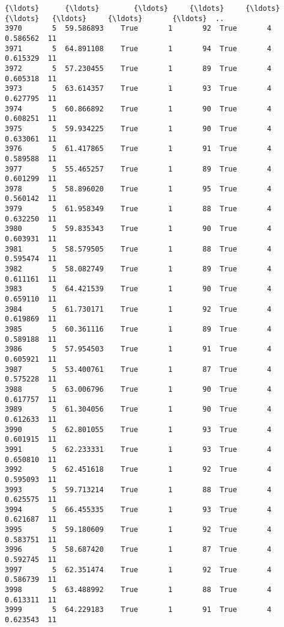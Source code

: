 \documentclass[11pt]{article}
\begin{document}
\begin{Verbatim}[commandchars=\\\{\}]
{\ldots}      {\ldots}        {\ldots}     {\ldots}     {\ldots}      {\ldots}   {\ldots}     {\ldots}       {\ldots}  ..   
3970       5  59.586893    True       1       92  True       4  0.586562  11   
3971       5  64.891108    True       1       94  True       4  0.615329  11   
3972       5  57.230455    True       1       89  True       4  0.605318  11   
3973       5  63.614357    True       1       93  True       4  0.627795  11   
3974       5  60.866892    True       1       90  True       4  0.608251  11   
3975       5  59.934225    True       1       90  True       4  0.633061  11   
3976       5  61.417865    True       1       91  True       4  0.589588  11   
3977       5  55.465257    True       1       89  True       4  0.601299  11   
3978       5  58.896020    True       1       95  True       4  0.560142  11   
3979       5  61.958349    True       1       88  True       4  0.632250  11   
3980       5  59.835343    True       1       90  True       4  0.603931  11   
3981       5  58.579505    True       1       88  True       4  0.595474  11   
3982       5  58.082749    True       1       89  True       4  0.611161  11   
3983       5  64.421539    True       1       90  True       4  0.659110  11   
3984       5  61.730171    True       1       92  True       4  0.619869  11   
3985       5  60.361116    True       1       89  True       4  0.589188  11   
3986       5  57.954503    True       1       91  True       4  0.605921  11   
3987       5  53.400761    True       1       87  True       4  0.575228  11   
3988       5  63.006796    True       1       90  True       4  0.617757  11   
3989       5  61.304056    True       1       90  True       4  0.612633  11   
3990       5  62.801055    True       1       93  True       4  0.601915  11   
3991       5  62.233331    True       1       93  True       4  0.650810  11   
3992       5  62.451618    True       1       92  True       4  0.595093  11   
3993       5  59.713214    True       1       88  True       4  0.625575  11   
3994       5  66.455335    True       1       93  True       4  0.621687  11   
3995       5  59.180609    True       1       92  True       4  0.583751  11   
3996       5  58.687420    True       1       87  True       4  0.592745  11   
3997       5  62.351474    True       1       92  True       4  0.586739  11   
3998       5  63.488992    True       1       88  True       4  0.613311  11   
3999       5  64.229183    True       1       91  True       4  0.623543  11   


\end{Verbatim}
\end{document}
